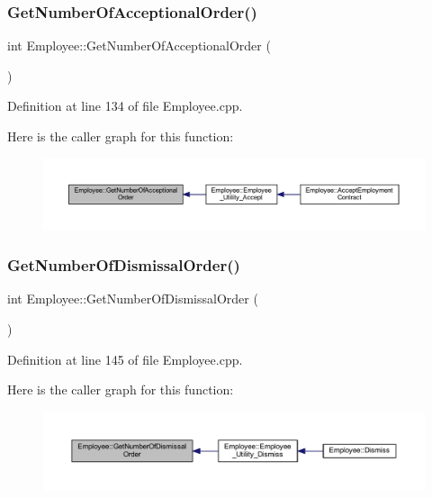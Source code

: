 \subsubsection{\texorpdfstring{Get\+Number\+Of\+Acceptional\+Order()}{GetNumberOfAcceptionalOrder()}}
{\footnotesize\ttfamily int Employee\+::\+Get\+Number\+Of\+Acceptional\+Order (\begin{DoxyParamCaption}{ }\end{DoxyParamCaption})}



Definition at line 134 of file Employee.\+cpp.

Here is the caller graph for this function\+:
\nopagebreak
\begin{figure}[H]
\begin{center}
\leavevmode
\includegraphics[width=350pt]{class_employee_a8ad22e912e2e4e336416df20480ceb54_icgraph}
\end{center}
\end{figure}
\mbox{\label{class_employee_a521952ca263ba6ad783c634631070076}} 
\subsubsection{\texorpdfstring{Get\+Number\+Of\+Dismissal\+Order()}{GetNumberOfDismissalOrder()}}
{\footnotesize\ttfamily int Employee\+::\+Get\+Number\+Of\+Dismissal\+Order (\begin{DoxyParamCaption}{ }\end{DoxyParamCaption})}



Definition at line 145 of file Employee.\+cpp.

Here is the caller graph for this function\+:
\nopagebreak
\begin{figure}[H]
\begin{center}
\leavevmode
\includegraphics[width=350pt]{class_employee_a521952ca263ba6ad783c634631070076_icgraph}
\end{center}
\end{figure}
\mbox{\label{class_employee_a37e77828f9f559a27951e3113b3fb520}} 
